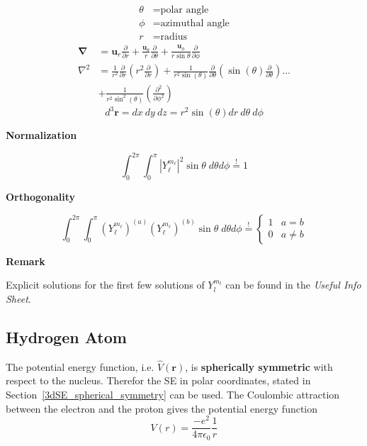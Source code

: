 \newpar{}
\begin{align*}
    \theta & = \text{polar angle}     \\
    \phi   & = \text{azimuthal angle} \\
    r      & = \text{radius}
\end{align*}
\begin{align*}
    \mathbf{\nabla} & =\mathbf{u}_{r}\frac{\partial}{\partial r}+\frac{\mathbf{u}_{\theta}}{r}\frac{\partial}{\partial\theta}+\frac{\mathbf{u}_{\phi}}{r\sin\theta}\frac{\partial}{\partial\phi}                                      \\
    \nabla^2        & =\frac{1}{r^2}\frac{\partial}{\partial r}\left(r^2\frac{\partial}{\partial r}\right) + \frac{1}{r^2\sin(\theta)}\frac{\partial}{\partial\theta}\left(\sin(\theta)\frac{\partial}{\partial \theta}\right) \ldots \\
                    & + \frac{1}{r^2\sin^2(\theta)}\left(\frac{\partial^2}{\partial \phi^2}\right)
\end{align*}
\begin{equation*}
    d^3\mathbf{r} = dx\:dy\:dz = r^2\sin(\theta)dr\:d\theta\:d\phi
\end{equation*}

\textbf{Normalization}

\noindent\begin{equation*}
    \int_0^{2\pi}\int_0^{\pi} |Y_\ell^{m_\ell}|^2 \sin\theta\;d\theta d\phi \overset{!}{=} 1
\end{equation*}

\textbf{Orthogonality}

\noindent\begin{equation*}
    \int_0^{2\pi}\int_0^{\pi} {(Y_\ell^{m_\ell})}^{(a)}{(Y_\ell^{m_\ell})}^{(b)} \sin\theta\;d\theta d\phi \overset{!}{=} \begin{cases}
        1 & a=b     \\
        0 & a\neq b
    \end{cases}
\end{equation*}

\textbf{Remark}

Explicit solutions for the first few solutions of $Y_l^{m_l}$ can be found in the \textit{Useful Info Sheet}.

\subsection{Hydrogen Atom}\label{H-atom}
The potential energy function, i.e. $\widehat{V}(\mathbf{r})$, is \textbf{spherically symmetric} with respect to the nucleus. Therefor the SE in polar coordinates, stated in Section~\ref{3dSE_spherical_symmetry} can be used.
\newpar{}
The Coulombic attraction between the electron and the proton gives the potential energy function
\begin{equation*}
    V(r) = \frac{-e^2}{4\pi\epsilon_0}\frac{1}{r}
\end{equation*}

